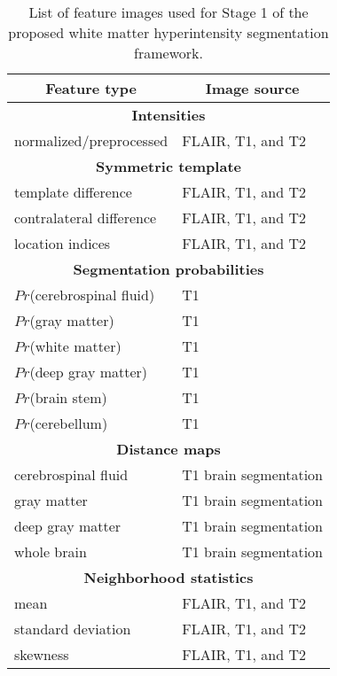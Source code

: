 \begin{table}[!htb]
  \centering
  \begin{tabular*}{0.65\textwidth}{@{\extracolsep{\fill}} ll}
    \multicolumn{1}{c}{\textbf{Feature type}} & \multicolumn{1}{c}{\textbf{Image source}} \\
    \toprule
    \midrule
    \multicolumn{2}{c}{\textbf{Intensities}} \\
    \midrule
    normalized/preprocessed & FLAIR, T1, and T2 \\
    \midrule
    \multicolumn{2}{c}{\textbf{Symmetric template}} \\
    \midrule
    template difference & FLAIR, T1, and T2 \\
    contralateral difference & FLAIR, T1, and T2 \\
    location indices & FLAIR, T1, and T2 \\
    \midrule
    \multicolumn{2}{c}{\textbf{Segmentation probabilities}} \\
    \midrule
    $Pr$(cerebrospinal fluid) & T1 \\
    $Pr$(gray matter) & T1 \\
    $Pr$(white matter) & T1 \\
    $Pr$(deep gray matter) & T1 \\
    $Pr$(brain stem) & T1 \\
    $Pr$(cerebellum) & T1 \\
    \midrule
    \multicolumn{2}{c}{\textbf{Distance maps}} \\
    \midrule
    cerebrospinal fluid & T1 brain segmentation \\
    gray matter & T1 brain segmentation \\
    deep gray matter & T1 brain segmentation \\
    whole brain & T1 brain segmentation \\
    \midrule
    \multicolumn{2}{c}{\textbf{Neighborhood statistics}} \\
    \midrule
    mean & FLAIR, T1, and T2 \\
    standard deviation & FLAIR, T1, and T2 \\
    skewness & FLAIR, T1, and T2 \\
    \midrule
    \bottomrule
  \end{tabular*}
 \label{table:indices}
 \caption{List of feature images used for Stage 1 of the proposed white matter
          hyperintensity segmentation framework.}
\end{table}


